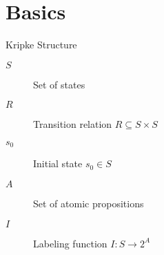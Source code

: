 \section{Basics}



\begin{frame}{Kripke Structure}
  \begin{definition}[$K = (S, R, s_0, A, I)$]
    \begin{description}
      \item[$S$] Set of states
      \item[$R$] Transition relation $R \subseteq S \times S$
      \item[$s_0$] Initial state $s_0 \in S$
      \item[$A$] Set of atomic propositions
      \item[$I$] Labeling function $I: S \to 2^A$
    \end{description}
  \end{definition}
\end{frame}
